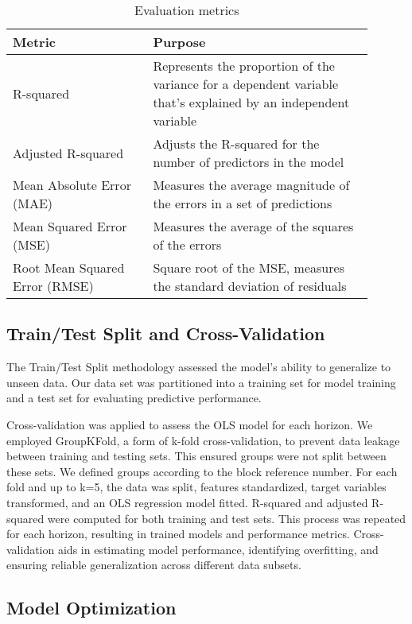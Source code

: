 \documentclass{article}
\begin{document}
\begin{table}[h!]
  \centering
  \small
  \begin{tabular}{|p{0.35\linewidth}|p{0.55\linewidth}|}
  \hline
  \textbf{Metric} & \textbf{Purpose} \\
  \hline
  R-squared & Represents the proportion of the variance for a dependent variable that's explained by an independent variable \\
  Adjusted R-squared & Adjusts the R-squared for the number of predictors in the model \\
  Mean Absolute Error (MAE) & Measures the average magnitude of the errors in a set of predictions \\
  Mean Squared Error (MSE) & Measures the average of the squares of the errors \\
  Root Mean Squared Error (RMSE) & Square root of the MSE, measures the standard deviation of residuals \\
  \hline
  \end{tabular}
  \caption{Evaluation metrics}
  \label{tab:metrics}
  \end{table}  

\subsection{Train/Test Split and Cross-Validation}

The Train/Test Split methodology assessed the model's ability to generalize to unseen data. Our data set was partitioned into a training set for model training and a test set for evaluating predictive performance.

Cross-validation was applied to assess the OLS model for each horizon. We employed GroupKFold, a form of k-fold cross-validation, to prevent data leakage between training and testing sets. This ensured groups were not split between these sets. We defined groups according to the block reference number. For each fold and up to k=5, the data was split, features standardized, target variables transformed, and an OLS regression model fitted. R-squared and adjusted R-squared were computed for both training and test sets. This process was repeated for each horizon, resulting in trained models and performance metrics. Cross-validation aids in estimating model performance, identifying overfitting, and ensuring reliable generalization across different data subsets.

\subsection{Model Optimization}\label{sec:model-optimization}
\end{document}
